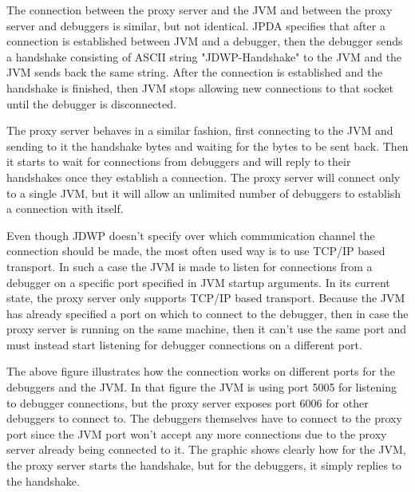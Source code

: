 \documentclass[..thesis.tex]{subfiles}
\begin{document}
The connection between the proxy server and the JVM and between the proxy server and debuggers is similar, but not identical.
JPDA specifies that after a connection is established between JVM and a debugger, then the debugger sends a handshake consisting of ASCII string "JDWP-Handshake" to the JVM and the JVM sends back the same string.
After the connection is established and the handshake is finished, then JVM stops allowing new connections to that socket until the debugger is disconnected.

The proxy server behaves in a similar fashion, first connecting to the JVM and sending to it the handshake bytes and waiting for the bytes to be sent back.
Then it starts to wait for connections from debuggers and will reply to their handshakes once they establish a connection.
The proxy server will connect only to a single JVM, but it will allow an unlimited number of debuggers to establish a connection with itself.

Even though JDWP doesn't specify over which communication channel the connection should be made, the most often used way is to use TCP/IP based transport.
In such a case the JVM is made to listen for connections from a debugger on a specific port specified in JVM startup arguments.
In its current state, the proxy server only supports TCP/IP based transport.
Because the JVM has already specified a port on which to connect to the debugger, then in case the proxy server is running on the same machine, then it can't use the same port and must instead start listening for debugger connections on a different port.



The above figure illustrates how the connection works on different ports for the debuggers and the JVM.
In that figure the JVM is using port 5005 for listening to debugger connections, but the proxy server exposes port 6006 for other debuggers to connect to.
The debuggers themselves have to connect to the proxy port since the JVM port won't accept any more connections due to the proxy server already being connected to it.
The graphic shows clearly how for the JVM, the proxy server starts the handshake, but for the debuggers, it simply replies to the handshake.
\end{document}
